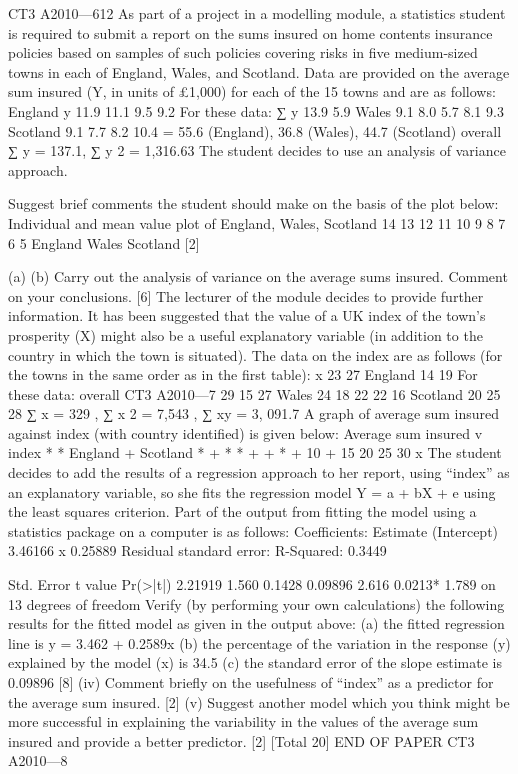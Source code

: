 
CT3 A2010—612
As part of a project in a modelling module, a statistics student is required to submit a
report on the sums insured on home contents insurance policies based on samples of
such policies covering risks in five medium-sized towns in each of England, Wales,
and Scotland. Data are provided on the average sum insured (Y, in units of £1,000)
for each of the 15 towns and are as follows:
England
y 11.9 11.1 9.5 9.2
For these data:
∑ y
13.9
5.9
Wales
9.1 8.0 5.7
8.1
9.3
Scotland
9.1 7.7 8.2
10.4
= 55.6 (England), 36.8 (Wales), 44.7 (Scotland)
overall
∑ y = 137.1, ∑ y 2
= 1,316.63
The student decides to use an analysis of variance approach.
\item 
Suggest brief comments the student should make on the basis of the plot
below:
Individual and mean value plot of England, Wales, Scotland
14
13
12
11
10
9
8
7
6
5
England
Wales
Scotland
[2]
\item 
(a)
(b)
Carry out the analysis of variance on the average sums insured.
Comment on your conclusions.
[6]
The lecturer of the module decides to provide further information. It has been
suggested that the value of a UK index of the town’s prosperity (X) might also be a
useful explanatory variable (in addition to the country in which the town is situated).
The data on the index are as follows (for the towns in the same order as in the first
table):
x
23
27
England
14 19
For these data: overall
CT3 A2010—7
29
15
27
Wales
24 18
22
22
16
Scotland
20 25
28
∑ x = 329 , ∑ x 2 = 7,543 , ∑ xy = 3, 091.7
A graph of average sum insured against index (with country identified) is given
below:
Average sum insured v index
*
* England
+ Scotland
*
+
*
*
+
+
*
%
+
%
10
%
+
%
%
15
20
25
30
x
The student decides to add the results of a regression approach to her report, using
“index” as an explanatory variable, so she fits the regression model
Y = a + bX + e
using the least squares criterion.
Part of the output from fitting the model using a statistics package on a computer is as
follows:
Coefficients: Estimate
(Intercept) 3.46166
x
0.25889
Residual standard error:
R-Squared: 0.3449
\item 
Std. Error t value Pr(>|t|)
2.21919
1.560 0.1428
0.09896
2.616 0.0213*
1.789 on 13 degrees of freedom
Verify (by performing your own calculations) the following results for the
fitted model as given in the output above:
(a) the fitted regression line is y = 3.462 + 0.2589x
(b) the percentage of the variation in the response (y) explained by the
model (x) is 34.5%
(c) the standard error of the slope estimate is 0.09896
[8]
(iv) Comment briefly on the usefulness of “index” as a predictor for the average
sum insured.
[2]
(v) Suggest another model which you think might be more successful in
explaining the variability in the values of the average sum insured and provide
a better predictor.
[2]
[Total 20]
END OF PAPER
CT3 A2010—8



